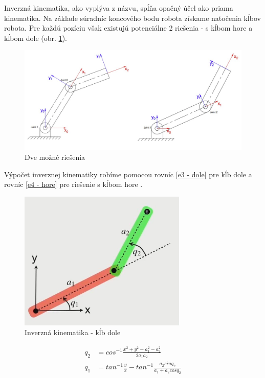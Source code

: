 Inverzná kinematika, ako vyplýva z názvu, spĺňa opačný účel ako priama kinematika. Na základe súradníc koncového bodu robota získame natočenia kĺbov robota. Pre každú pozíciu však existujú potenciálne 2 riešenia - s kĺbom hore a kĺbom dole (obr. \ref{OBRAZOK 4.10}). 

\begin{figure}[h]
	\centering
	\includegraphics[width=140mm]{img/IK-EUED.png}
	\caption{Dve možné riešenia \cite{FKIK}} \label{OBRAZOK 4.10} 
\end{figure} 

Výpočet inverznej kinematiky robíme pomocou rovníc  \ref{e3 - dole} pre kĺb dole  a rovníc \ref{e4 - hore} pre riešenie s kĺbom hore  \cite{prezentacia}.

\begin{figure}[h]
	\centering
	\includegraphics[width=80mm]{img/IK1.png}
	\caption{ Inverzná kinematika - kĺb dole \cite{prezentacia}} \label{OBRAZOK 4.11} 
\end{figure} 

\begin{equation}
	\begin{aligned}
		q_2&= cos^{-1} \frac{x^2 + y^2 - a_1^2 - a_2^2}{2 a_1 a_2 }\\
		q_1&=  tan^{-1} \frac{y}{x} - tan^{-1} \frac{a_2 sinq_2}{a_1 + a_2 cos q_2} \\
	\end{aligned}
	\label{e3 - dole} 
\end{equation}

